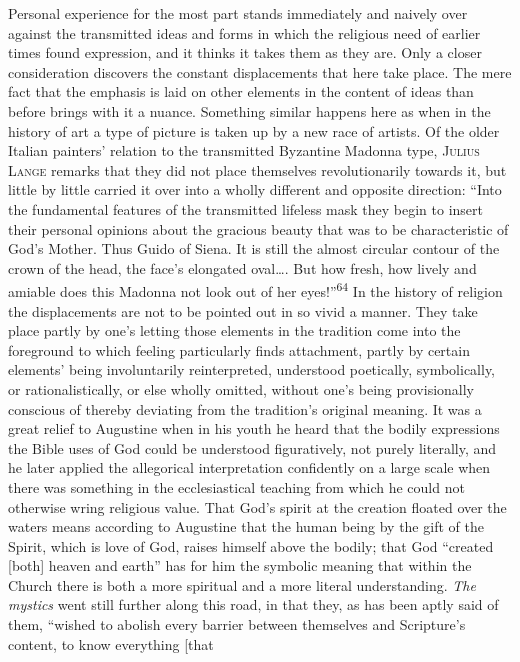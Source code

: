 \documentclass[12pt,a4paper]{book}
\newcommand{\opage}[1]{\marginnote{\footnotesize\textit{[#1]}}}
\begin{document}
Personal experience for the most part stands immediately and naively 
\opage{121}over against the transmitted ideas
and forms in which the religious need of earlier times found expression, and it thinks it takes them as
they are. Only a closer consideration discovers the constant displacements that here take place. The mere
fact that the emphasis is laid on other elements in the content of ideas than before brings with it a
nuance. Something similar happens here as when in the history of art a type of picture is taken up by a
new race of artists. Of the older Italian painters' relation to the transmitted Byzantine Madonna type,
\textsc{Julius Lange} remarks that they did not place themselves revolutionarily towards it, but little by
little carried it over into a wholly different and opposite direction: ``Into the fundamental features of
the transmitted lifeless mask they begin to insert their personal opinions about the gracious beauty that
was to be characteristic of God's Mother. Thus Guido of Siena. It is still the almost circular contour of
the crown of the head, the face's elongated oval\ldots. But how fresh, how lively and amiable does this
Madonna not look out of her eyes!''\textsuperscript{64} In the history of religion the displacements are
not to be pointed out in so vivid a manner. They take place partly by one's letting those elements in the
tradition come into the foreground to which feeling particularly finds attachment, partly by certain
elements' being involuntarily reinterpreted, understood poetically, symbolically, or rationalistically, or
else wholly omitted, without one's being provisionally conscious of thereby deviating from the tradition's
original meaning. It was a great relief to Augustine when in his youth he heard that the bodily expressions
the Bible uses of God could be understood figuratively, not purely literally, and he later applied the
allegorical interpretation confidently on a large scale when there was something in the ecclesiastical
teaching from which he could not otherwise wring religious value. That God's spirit at the creation floated
over the waters means according to Augustine that the human being by the gift of the Spirit, which is love
of God, raises himself above the bodily; that God ``created [both] heaven and earth'' has for him the
symbolic meaning that within the Church there is both a more spiritual and a more literal understanding.
\emph{The mystics} went still further along this road, in that they, as has been aptly said of them,
``wished to abolish every barrier between themselves and Scripture's content, to know everything [that
\end{document}
